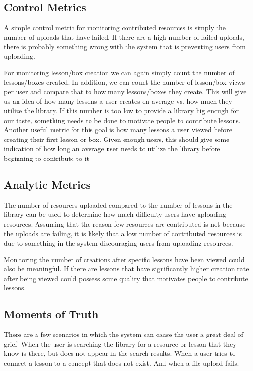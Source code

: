 \documentclass[10pt,letter]{article}
\begin{document}
\subsection{Control Metrics}
A simple control metric for monitoring contributed resources is simply the
number of uploads that have failed. If there are a high number of failed
uploads, there is probably something wrong with the system that is preventing
users from uploading.

For monitoring lesson/box creation we can again simply count the number of
lessons/boxes created. In addition, we can count the number of lesson/box views
per user and compare that to how many lessons/boxes they create. This will give
us an idea of how many lessons a user creates on average vs. how much they
utilize the library. If this number is too low to provide a library big enough
for our taste, something needs to be done to motivate people to contribute
lessons. Another useful metric for this goal is how many lessons a user viewed
before creating their first lesson or box. Given enough users, this should give
some indication of how long an average user needs to utilize the library before
beginning to contribute to it.

\subsection{Analytic Metrics}
The number of resources uploaded compared to the number of lessons in the
library can be used to determine how much difficulty users have uploading
resources. Assuming that the reason few resources are contributed is not because
the uploads are failing, it is likely that a low number of contributed resources
is due to something in the system discouraging users from uploading resources.

Monitoring the number of creations after specific lessons have been viewed could
also be meaningful. If there are lessons that have significantly higher creation
rate after being viewed could possess some quality that motivates people to
contribute lessons.

\subsection{Moments of Truth}
There are a few scenarios in which the system can cause the user a great deal of
grief. When the user is searching the library for a resource or lesson that they
know is there, but does not appear in the search results. When a user tries to
connect a lesson to a concept that does not exist. And when a file upload fails.
\end{document}
